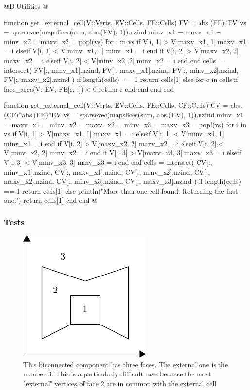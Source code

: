@D Utilities
@{function get_external_cell(V::Verts, EV::Cells, FE::Cells)
    FV = abs.(FE)*EV
    vs = sparsevec(mapslices(sum, abs.(EV), 1)).nzind
    minv_x1 = maxv_x1 = minv_x2 = maxv_x2 = pop!(vs)
    for i in vs
        if V[i, 1] > V[maxv_x1, 1]
            maxv_x1 = i
        elseif V[i, 1] < V[minv_x1, 1]
            minv_x1 = i
        end
        if V[i, 2] > V[maxv_x2, 2]
            maxv_x2 = i
        elseif V[i, 2] < V[minv_x2, 2]
            minv_x2 = i
        end
    end
    cells = intersect(
        FV[:, minv_x1].nzind, 
        FV[:, maxv_x1].nzind,
        FV[:, minv_x2].nzind,
        FV[:, maxv_x2].nzind
    )
    if length(cells) == 1
        return cells[1]
    else
        for c in cells
            if face_area(V, EV, FE[c, :]) < 0
                return c
            end
        end
    end
end

function get_external_cell(V::Verts, EV::Cells, FE::Cells, CF::Cells)
    CV = abs.(CF)*abs.(FE)*EV
    vs = sparsevec(mapslices(sum, abs.(EV), 1)).nzind
    minv_x1 = maxv_x1 = minv_x2 = maxv_x2 = minv_x3 = maxv_x3 = pop!(vs)
    for i in vs
        if V[i, 1] > V[maxv_x1, 1]
            maxv_x1 = i
        elseif V[i, 1] < V[minv_x1, 1]
            minv_x1 = i
        end
        if V[i, 2] > V[maxv_x2, 2]
            maxv_x2 = i
        elseif V[i, 2] < V[minv_x2, 2]
            minv_x2 = i
        end
        if V[i, 3] > V[maxv_x3, 3]
            maxv_x3 = i
        elseif V[i, 3] < V[minv_x3, 3]
            minv_x3 = i
        end
    end
    cells = intersect(
        CV[:, minv_x1].nzind, 
        CV[:, maxv_x1].nzind,
        CV[:, minv_x2].nzind,
        CV[:, maxv_x2].nzind,
        CV[:, minv_x3].nzind,
        CV[:, maxv_x3].nzind
    )
    if length(cells) == 1
        return cells[1]
    else
        println("More than one cell found. Returning the first one.")
        return cells[1]
    end
end
@}

\subsubsection{Tests}
\begin{figure}[h]
    \centering
    \includegraphics{./img/ch2-externcell.pdf}
    \caption{This biconnected component has three faces. The external one is the number 3.
    This is a particularly difficult case because the most "external" vertices of face 2
    are in common with the external cell.}
\end{figure}


